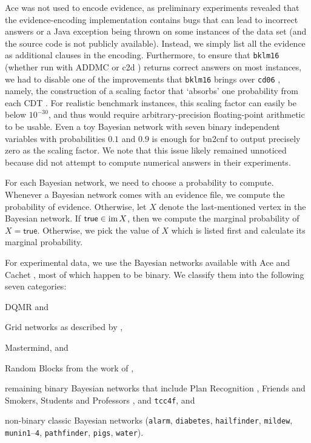 \textsf{Ace} was not used to encode evidence, as preliminary experiments
revealed that the evidence-encoding implementation contains bugs that can lead
to incorrect answers or a Java exception being thrown on some instances of the
data set (and the source code is not publicly available). Instead, we simply
list all the evidence as additional clauses in the encoding. Furthermore, to
ensure that \texttt{bklm16} \citep{DBLP:conf/ecai/BartKLM16} (whether run with
\textsf{ADDMC} \citep{DBLP:conf/aaai/DudekPV20} or \textsf{c2d}
\citep{DBLP:conf/ecai/Darwiche04}) returns correct answers on most instances, we
had to disable one of the improvements that \texttt{bklm16} brings over
\texttt{cd06} \citep{DBLP:conf/sat/ChaviraD06}, namely, the construction of a
scaling factor that `absorbs' one probability from each CDT
\citep{DBLP:conf/ecai/BartKLM16}. For realistic benchmark instances, this
scaling factor can easily be below $10^{-30}$, and thus would require
arbitrary-precision floating-point arithmetic to be usable. Even a toy Bayesian
network with seven binary independent variables with probabilities $0.1$ and
$0.9$ is enough for \textsf{bn2cnf} to output precisely zero as the scaling
factor. We note that this issue likely remained unnoticed because
\citet{DBLP:conf/ecai/BartKLM16} did not attempt to compute numerical answers in
their experiments.

For each Bayesian network, we need to choose a probability to compute. Whenever
a Bayesian network comes with an evidence file, we compute the probability of
evidence. Otherwise, let $X$ denote the last-mentioned vertex in the Bayesian
network. If $\mathsf{true} \in \operatorname{im} X$, then we compute the marginal probability
of $X = \mathsf{true}$. Otherwise, we pick the value of $X$ which is listed
first and calculate its marginal probability.

For experimental data, we use the Bayesian networks available with \textsf{Ace}
and \textsf{Cachet} \citep{DBLP:conf/sat/SangBBKP04}, most of which happen to be
binary. We classify them into the following seven categories:
\begin{itemize*}
\item DQMR and
\item Grid networks as described by \citet{DBLP:conf/aaai/SangBK05},
\item Mastermind, and
\item Random Blocks from the work of \citet{DBLP:journals/ijar/ChaviraDJ06},
\item remaining binary Bayesian networks that include Plan Recognition
  \citep{DBLP:conf/aaai/SangBK05}, Friends and Smokers, Students and Professors
  \citep{DBLP:journals/ijar/ChaviraDJ06}, and \texttt{tcc4f}, and
\item non-binary classic Bayesian networks (\texttt{alarm}, \texttt{diabetes},
  \texttt{hailfinder}, \texttt{mildew}, \texttt{munin1}--\texttt{4},
  \texttt{pathfinder}, \texttt{pigs}, \texttt{water}).
\end{itemize*}

